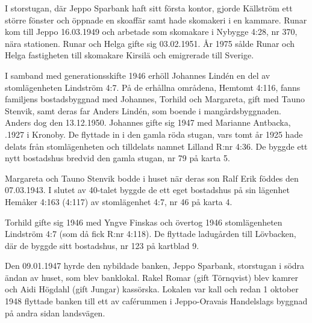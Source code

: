 I storstugan, där Jeppo Sparbank haft sitt första kontor, gjorde Källström ett större fönster och	öppnade en skoaffär samt hade skomakeri i en kammare. Runar kom till Jeppo 16.03.1949 och arbetade som skomakare i Nybygge 4:28, nr 370, nära stationen. Runar och Helga gifte sig 03.02.1951. År 1975 sålde Runar och Helga fastigheten till skomakare Kirsilä och emigrerade till Sverige.


I samband med generationsskifte 1946 erhöll Johannes Lindén en del av stomlägenheten Lindström 4:7. På de erhållna områdena, Hemtomt 4:116, fanns familjens bostadsbyggnad med Johannes, Torhild och Margareta, gift med Tauno Stenvik, samt deras far Anders Lindén, som boende i mangårdsbyggnaden. Anders dog den 13.12.1950. Johannes gifte sig 1947 med Marianne Antbacka, .1927 i Kronoby. De flyttade in i den gamla röda stugan, vars tomt år 1925 hade delats från stomlägenheten och tilldelats namnet Lilland R:nr 4:36. De byggde ett nytt bostadshus bredvid den gamla stugan, nr 79 på karta 5.

Margareta och Tauno Stenvik bodde i huset när deras son Ralf Erik föddes den 07.03.1943. I slutet av 40-talet byggde de ett eget bostadshus på sin lägenhet Hemåker 4:163 (4:117) av stomlägenhet 4:7, nr 46 på karta 4.

Torhild gifte sig 1946 med Yngve Finskas och övertog 1946 stomlägenheten Lindström 4:7 (som då fick R:nr 4:118). De flyttade ladugården till Lövbacken, där de byggde sitt bostadshus, nr 123 på kartblad 9.

Den 09.01.1947 hyrde den nybildade banken, Jeppo Sparbank, storstugan i södra ändan av huset, som blev banklokal. Rakel Romar (gift Törnqvist) blev kamrer och Aidi Högdahl (gift Jungar) kassörska. Lokalen var kall och redan 1 oktober 1948 flyttade banken till ett av caférummen i Jeppo-Oravais Handelslags byggnad på andra sidan landsvägen.


